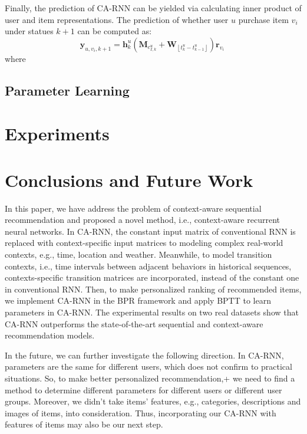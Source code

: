 \documentclass{sig-alternate}
\begin{document}
Finally, the prediction of CA-RNN can be yielded via calculating inner product of user and item representations. The prediction of whether user $u$ purchase item $v_i$ under statues $k+1$ can be computed as: 
\begin{equation}
\textbf{y}_{u,v_i,k+1} = \textbf{h}_{k}^{u}\left( \textbf{M}_{c_{I,k}^{u}} +\textbf{W}_{\left\lfloor t_k^u-t_{k-1}^u \right\rfloor }\right)\textbf{r}_{v_{i}}~
\end{equation}
where 




\subsection{Parameter Learning}

\section{Experiments}

\section{Conclusions and Future Work}

In this paper, we have address the problem of context-aware sequential recommendation and proposed a novel method, i.e., context-aware recurrent neural networks. In CA-RNN, the constant input matrix of conventional RNN is replaced with context-specific input matrices to modeling complex real-world contexts, e.g., time, location and weather. Meanwhile, to model transition contexts, i.e., time intervals between adjacent behaviors in historical sequences, contexts-specific transition matrices are incorporated, instead of the constant one in conventional RNN. Then, to make personalized ranking of recommended items, we implement CA-RNN in the BPR framework and apply BPTT to learn parameters in CA-RNN. The experimental results on two real datasets show that CA-RNN outperforms the state-of-the-art sequential and context-aware recommendation models.

In the future, we can further investigate the following direction. In CA-RNN, parameters are the same for different users, which does not confirm to practical situations. So, to make better personalized recommendation,+ we need to find a method to determine different parameters for different users or different user groups. Moreover, we didn't take items' features, e.g., categories, descriptions and images of items, into consideration. Thus, incorporating our CA-RNN with features of items may also be our next step.

\small


\vspace{2cm}

\balancecolumns
\end{document}
